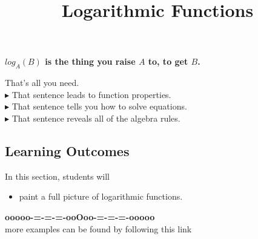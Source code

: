 \documentclass{ximera}
\title{Logarithmic Functions}
\begin{document}
\begin{abstract}
\end{abstract}
\maketitle





\begin{center}
\textbf{\textcolor{red!80!black}{$log_A(B)$ is the thing you raise $A$ to, to get $B$.}}
\end{center}


That's all you need. \\

\textbf{\textcolor{red!90!darkgray}{$\blacktriangleright$}} That sentence leads to function properties. \\

\textbf{\textcolor{red!90!darkgray}{$\blacktriangleright$}} That sentence tells you how to solve equations. \\

\textbf{\textcolor{red!90!darkgray}{$\blacktriangleright$}} That sentence reveals all of the algebra rules. \\










\subsection*{Learning Outcomes}


\begin{sectionOutcomes}
In this section, students will 

\begin{itemize}
\item paint a full picture of logarithmic functions.
\end{itemize}
\end{sectionOutcomes}













\begin{center}
\textbf{\textcolor{green!50!black}{ooooo-=-=-=-ooOoo-=-=-=-ooooo}} \\

more examples can be found by following this link\\ 

\end{center}
\end{document}
